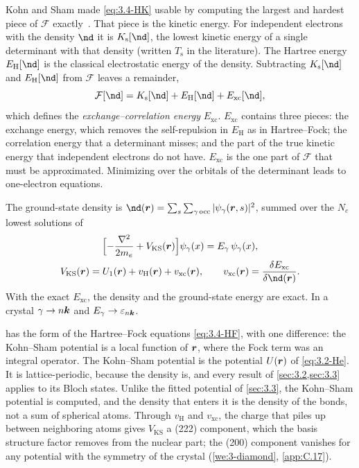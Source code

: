Kohn and Sham made \cref{eq:3.4-HK} usable by computing the largest and hardest piece of $\mathcal{F}$ exactly~\cite{kohn1965self}. That piece is the kinetic energy. For independent electrons with the density $\nd$ it is $K_{\mathrm{s}}[\nd]$, the lowest kinetic energy of a single determinant with that density (written $T_{\mathrm{s}}$ in the literature). The Hartree energy $E_{\mathrm{H}}[\nd]$ is the classical electrostatic energy of the density. Subtracting $K_{\mathrm{s}}[\nd]$ and $E_{\mathrm{H}}[\nd]$ from $\mathcal{F}$ leaves a remainder,
\begin{equation*}
  \mathcal{F}[\nd] = K_{\mathrm{s}}[\nd] + E_{\mathrm{H}}[\nd] + E_{\mathrm{xc}}[\nd] ,
\end{equation*}
which defines the \emph{exchange--correlation energy} $E_{\mathrm{xc}}$. $E_{\mathrm{xc}}$ contains three pieces: the exchange energy, which removes the self-repulsion in $E_{\mathrm{H}}$ as in Hartree--Fock; the correlation energy that a determinant misses; and the part of the true kinetic energy that independent electrons do not have. $E_{\mathrm{xc}}$ is the one part of $\mathcal{F}$ that must be approximated. Minimizing over the orbitals of the determinant leads to one-electron equations.
\begin{keyresult}
The ground-state density is $\nd(\vect{r}) = \sum_s\sum_{\gamma\,\mathrm{occ}}|\psi_\gamma(\vect{r}, s)|^2$, summed over the $N_e$ lowest solutions of
\begin{equation}
  \begin{gathered}
  \Bigl[-\frac{\nabla^2}{2m_e} + V_{\mathrm{KS}}(\vect{r})\Bigr]\psi_\gamma(x) = E_\gamma\,\psi_\gamma(x) , \\
  V_{\mathrm{KS}}(\vect{r}) = U_1(\vect{r}) + v_{\mathrm{H}}(\vect{r}) + v_{\mathrm{xc}}(\vect{r}) , \qquad
  v_{\mathrm{xc}}(\vect{r}) = \frac{\delta E_{\mathrm{xc}}}{\delta\nd(\vect{r})} .
  \end{gathered}
  \label{eq:3.4-KS}
\end{equation}
With the exact $E_{\mathrm{xc}}$, the density and the ground-state energy are exact. In a crystal $\gamma \to n\bm{k}$ and $E_\gamma \to \varepsilon_{n\bm{k}}$.
\end{keyresult}
 has the form of the Hartree--Fock equations \cref{eq:3.4-HF}, with one difference: the Kohn--Sham potential is a local function of $\bm{r}$, where the Fock term was an integral operator. The Kohn--Sham potential is the potential $U(\bm{r})$ of \cref{eq:3.2-He}. It is lattice-periodic, because the density is, and every result of \cref{sec:3.2,sec:3.3} applies to its Bloch states. Unlike the fitted potential of \cref{sec:3.3}, the Kohn--Sham potential is computed, and the density that enters it is the density of the bonds, not a sum of spherical atoms. Through $v_{\mathrm{H}}$ and $v_{\mathrm{xc}}$, the charge that piles up between neighboring atoms gives $V_{\mathrm{KS}}$ a (222) component, which the basis structure factor removes from the nuclear part; the (200) component vanishes for any potential with the symmetry of the crystal (\cref{we:3-diamond}, \cref{app:C.17}).

